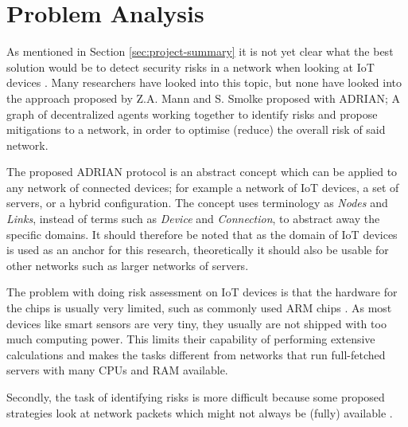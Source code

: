 \section{Problem Analysis}
\label{sec:problem-analysis}



As mentioned in Section \ref{sec:project-summary} it is not yet clear what the best solution would be to detect security risks in a network when looking at IoT devices \cite{zarpelao2017survey}. Many researchers have looked into this topic, but none have looked into the approach proposed by Z.A. Mann and S. Smolke proposed with ADRIAN; A graph of decentralized agents working together to identify risks and propose mitigations to a network, in order to optimise (reduce) the overall risk of said network.

The proposed ADRIAN protocol is an abstract concept which can be applied to any network of connected devices; for example a network of IoT devices, a set of servers, or a hybrid configuration. The concept uses terminology as \emph{Nodes} and \emph{Links}, instead of terms such as \emph{Device} and \emph{Connection}, to abstract away the specific domains. It should therefore be noted that as the domain of IoT devices is used as an anchor for this research, theoretically it should also be usable for other networks such as larger networks of servers. 

The problem with doing risk assessment on IoT devices is that the hardware for the chips is usually very limited, such as commonly used ARM chips \cite{singh2020overview}. As most devices like smart sensors are very tiny, they usually are not shipped with too much computing power. This limits their capability of performing extensive calculations and makes the tasks different from networks that run full-fetched servers with many CPUs and RAM available.

Secondly, the task of identifying risks is more difficult because some proposed strategies look at network packets which might not always be (fully) available \cite{canedo2016using, hamza2019detecting, sivanathan2018classifying}.

